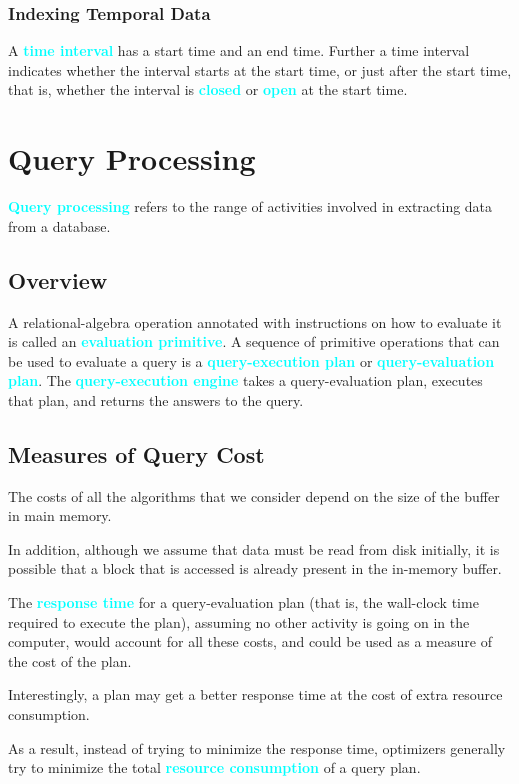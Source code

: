 \documentclass[a4paper,12pt,twoside,openany]{book}
\newcommand{\textcy}[1]{\textbf{\textcolor{cyan}{#1}}}
\begin{document}
\subsection{Indexing Temporal Data}

A \textcy{time interval} has a start time and an end time. Further a time interval indicates whether the interval starts at the start time, or just after the start time, that is, whether the interval is \textcy{closed} or \textcy{open} at the start time.

\chapter{Query Processing}

\textcy{Query processing} refers to the range of activities involved in extracting data from a database.

\section{Overview}

A relational-algebra operation annotated with instructions on how to evaluate it is called an \textcy{evaluation primitive}. A sequence of primitive operations that can be used to evaluate a query is a \textcy{query-execution plan} or \textcy{query-evaluation plan}. The \textcy{query-execution engine} takes a query-evaluation plan, executes that plan, and returns the answers to the query.

\section{Measures of Query Cost}

The costs of all the algorithms that we consider depend on the size of the buffer in main memory.

In addition, although we assume that data must be read from disk initially, it is possible that a block that is accessed is already present in the in-memory buffer.

The \textcy{response time} for a query-evaluation plan (that is, the wall-clock time required to execute the plan), assuming no other activity is going on in the computer, would account for all these costs, and could be used as a measure of the cost of the plan.

Interestingly, a plan may get a better response time at the cost of extra resource consumption.

As a result, instead of trying to minimize the response time, optimizers generally try to minimize the total \textcy{resource consumption} of a query plan.
\end{document}
